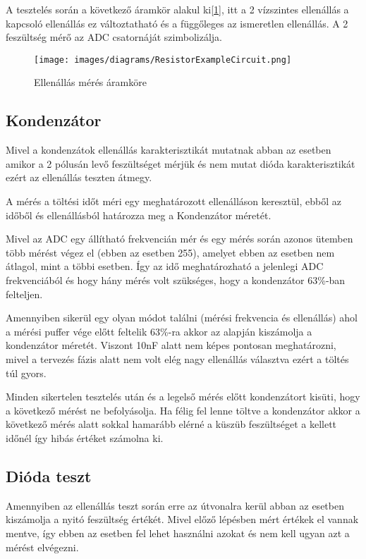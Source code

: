 A tesztelés során a következő áramkör alakul ki[\ref{fig:ResistorExampleCircuit}], 
itt a 2 
vízszintes ellenállás a kapcsoló ellenállás ez változtatható
és a függőleges az ismeretlen ellenállás. A 2 feszültség mérő az ADC
csatornáját szimbolizálja.

\begin{figure}[H]
    \centering
    \texttt{[image: images/diagrams/ResistorExampleCircuit.png]}
    \caption{Ellenállás mérés áramköre}
    \label{fig:ResistorExampleCircuit}
\end{figure}

\subsection{Kondenzátor}

Mivel a kondenzátok ellenállás karakterisztikát mutatnak abban az esetben
amikor a 2 pólusán levő feszültséget mérjük és nem mutat 
dióda karakterisztikát ezért az ellenállás 
teszten átmegy.

A mérés a töltési időt méri egy meghatározott ellenálláson keresztül,
ebből az időből és ellenállásból határozza meg a Kondenzátor méretét.

Mivel az ADC egy állítható frekvencián mér és egy mérés során azonos ütemben
több mérést végez el (ebben az esetben 255), amelyet ebben az esetben
nem átlagol, mint a többi esetben. Így az idő meghatározható a jelenlegi
ADC frekvenciából és hogy hány mérés volt szükséges, hogy a kondenzátor
63\%-ban felteljen.

Amennyiben sikerül egy olyan módot találni (mérési frekvencia és ellenállás)
ahol a mérési puffer vége előtt feltelik 63\%-ra akkor az alapján kiszámolja
a kondenzátor méretét. Viszont 10nF alatt nem képes pontosan meghatározni,
mivel a tervezés fázis alatt nem volt elég nagy ellenállás választva
ezért a töltés túl gyors.

Minden sikertelen tesztelés után és a legelső mérés előtt kondenzátort kisüti, 
hogy a következő mérést ne befolyásolja. Ha félig fel lenne töltve a kondenzátor
akkor a következő mérés alatt sokkal hamarább elérné a küszüb feszültséget
a kellett időnél így hibás értéket számolna ki.



\subsection{Dióda teszt}

Amennyiben az ellenállás teszt során erre az útvonalra kerül
abban az esetben kiszámolja a nyitó feszültség értékét.
Mivel előző lépésben mért értékek el vannak mentve, így ebben 
az esetben fel lehet használni azokat és nem kell ugyan azt a 
mérést elvégezni.

